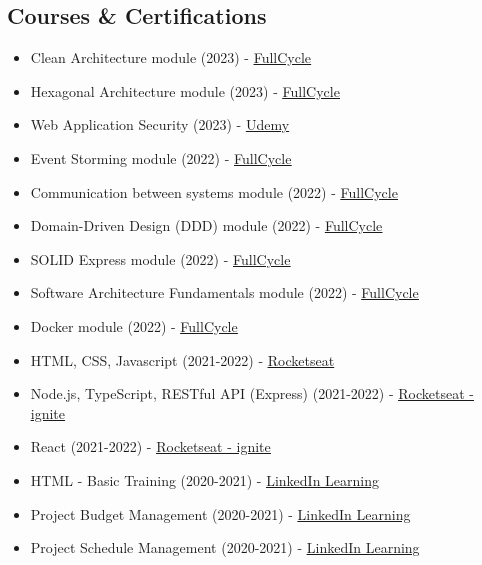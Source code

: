 \documentclass[11pt,a4paper,sans]{moderncv}
\begin{document}
\begin{samepage}
	\section{Courses \& Certifications}
	 {\begin{itemize}[label=\textbullet]
		  \item Clean Architecture module (2023) - \underline{\color{blue}\href{https://fullcycle.com}{FullCycle}}
		  \item Hexagonal Architecture module (2023) - \underline{\color{blue}\href{https://fullcycle.com}{FullCycle}}
		  \item Web Application Security (2023) - \underline{\color{blue}\href{https://udemy.com}{Udemy}}
		  \item Event Storming module (2022) - \underline{\color{blue}\href{https://fullcycle.com}{FullCycle}}
		  \item Communication between systems module (2022) - \underline{\color{blue}\href{https://fullcycle.com}{FullCycle}}
		  \item Domain-Driven Design (DDD) module (2022) - \underline{\color{blue}\href{https://fullcycle.com}{FullCycle}}
		  \item SOLID Express module (2022) - \underline{\color{blue}\href{https://fullcycle.com}{FullCycle}}
		  \item Software Architecture Fundamentals module (2022) - \underline{\color{blue}\href{https://fullcycle.com}{FullCycle}}
		  \item Docker module (2022) - \underline{\color{blue}\href{https://fullcycle.com}{FullCycle}}
		  \item HTML, CSS, Javascript (2021-2022) - \underline{\color{blue}\href{https://rocketseat.com.br}{Rocketseat}}
		  \item Node.js, TypeScript, RESTful API (Express) (2021-2022) - \underline{\color{blue}\href{https://rocketseat.com.br}{Rocketseat - ignite}}
		  \item React (2021-2022) - \underline{\color{blue}\href{https://rocketseat.com.br}{Rocketseat - ignite}}
		  \item HTML - Basic Training (2020-2021) - \underline{\color{blue}\href{https://linkedin.com/learning}{LinkedIn Learning}}
		  \item Project Budget Management (2020-2021) - \underline{\color{blue}\href{https://linkedin.com/learning}{LinkedIn Learning}}
		  \item Project Schedule Management (2020-2021) - \underline{\color{blue}\href{https://linkedin.com/learning}{LinkedIn Learning}}

\end{itemize}}
\end{samepage}
\end{document}
